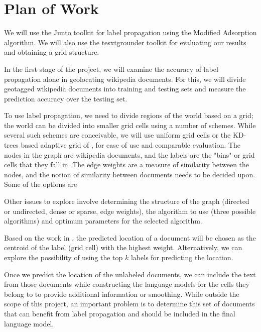 \documentclass[11pt]{article}
\begin{document}
\cite{talukdar:09} \cite{talukdar:10}

\section{Plan of Work}
We will use the Junto toolkit \cite{junto} for label propagation using the Modified Adsorption algorithm.
We will also use the tesxtgrounder toolkit for evaluating our results and obtaining a grid structure.

In the first stage of the project, we will examine the accuracy of label propagation alone in
geolocating wikipedia documents. For this, we will divide geotagged wikipedia documents
into training and testing sets and measure the prediction accuracy over the testing set.


To use label propagation, we need to divide regions of the world based on a grid; 
the world can be divided into smaller grid cells using a number of schemes. 
While several such schemes are conceivable, we will use uniform grid cells or the KD-trees based adaptive grid of \cite{rolleretal:12}, for ease of use and comparable evaluation. 
The nodes in the graph are wikipedia documents, and the labels are the "bins" or 
grid cells that they fall in. The edge weights are a measure of similarity between the nodes, 
and the notion of similarity between documents needs to be decided upon. 
Some of the options are %

Other issues to explore involve determining the structure of the graph 
(directed or undirected, dense or sparse, edge weights), the algorithm to use 
(three possible algorithms) and optimum parameters for the selected algorithm. 

Based on the work in \cite{rolleretal:12}, the predicted location of a document will be chosen as the 
centroid of the label (grid cell) with the highest weight. Alternatively, we can explore the possibility of
using the top $k$ labels for predicting the location.

Once we predict the location of the unlabeled documents, 
we can include the text from those documents
while constructing the language models for the cells they belong to 
to provide additional information or smoothing.
While outside the scope of this project, an important problem is to determine this set of documents 
that can benefit from label propagation and should be included in the final language model.
\end{document}
